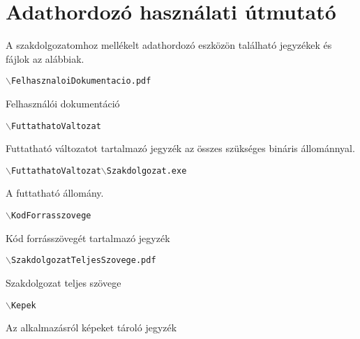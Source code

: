 \chapter*{Adathordozó használati útmutató}



\noindent A szakdolgozatomhoz mellékelt adathordozó eszközön található jegyzékek és fájlok az alábbiak.

\bigskip

\noindent \texttt{$\backslash$FelhasznaloiDokumentacio.pdf}

\medskip

Felhasználói dokumentáció

\bigskip

\noindent \texttt{$\backslash$FuttathatoValtozat}

\medskip

Futtatható változatot tartalmazó jegyzék az összes szükséges bináris állománnyal.

\bigskip

\noindent \texttt{$\backslash$FuttathatoValtozat$\backslash$Szakdolgozat.exe}

\medskip

A futtatható állomány.

\bigskip

\noindent \texttt{$\backslash$KodForrasszovege}

\medskip

Kód forrásszövegét tartalmazó jegyzék

\bigskip

\noindent \texttt{$\backslash$SzakdolgozatTeljesSzovege.pdf}

\medskip

Szakdolgozat teljes szövege

\bigskip

\noindent \texttt{$\backslash$Kepek}

\medskip

Az alkalmazásról képeket tároló jegyzék
